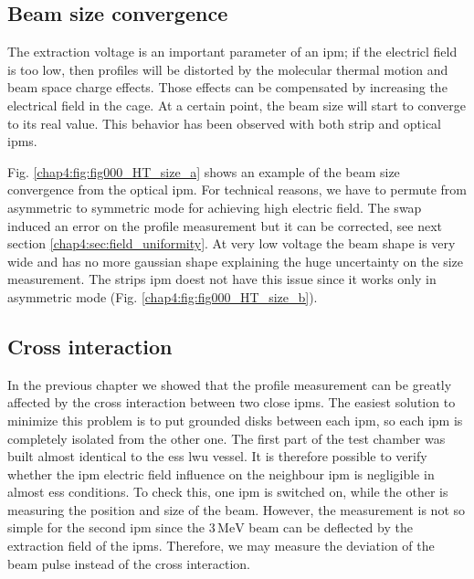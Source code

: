 \begin{refsection}
  \subsection{Beam size convergence}

  The extraction voltage is an important parameter of an \acrshort{ipm}; if the electricl field is too low, then profiles will be distorted by the molecular thermal motion and beam space charge effects. Those effects can be compensated by increasing the electrical field in the cage. At a certain point, the beam size will start to converge to its real value. This behavior has been observed with both strip and optical \acrshort{ipm}s.
  

  Fig. \ref{chap4:fig:fig000_HT_size_a} shows an example of the beam size convergence from the optical \acrshort{ipm}. For technical reasons, we have to permute from asymmetric to symmetric mode for achieving high electric field. The swap induced an error on the profile measurement but it can be corrected, see next section \ref{chap4:sec:field_uniformity}. At very low voltage the beam shape is very wide and has no more gaussian shape explaining the huge uncertainty on the size measurement. The strips \acrshort{ipm} doest not have this issue since it works only in asymmetric mode (Fig. \ref{chap4:fig:fig000_HT_size_b}).

  \subsection{Cross interaction }

  In the previous chapter we showed that the profile measurement can be greatly affected by the cross interaction between two close \acrshort{ipm}s. The easiest solution to minimize this problem is to put grounded disks between each \acrshort{ipm}, so each \acrshort{ipm} is completely isolated from the other one. The first part of the test chamber was built almost identical to the \acrshort{ess} \acrshort{lwu} vessel. It is therefore possible to verify whether the \acrshort{ipm} electric field influence on the neighbour \acrshort{ipm}  is negligible in almost \acrshort{ess} conditions. To check this, one \acrshort{ipm} is switched on, while the other is measuring the position and size of the beam. However, the measurement is not so simple for the second \acrshort{ipm} since the $3\,\mathrm{MeV}$ beam can be deflected by the extraction field of the \acrshort{ipm}s. Therefore, we may measure the deviation of the beam pulse instead of the cross interaction. 
  


\end{refsection}
